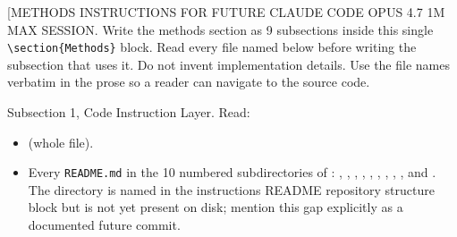 %
%

\begin{sectionaccent}

[METHODS INSTRUCTIONS FOR FUTURE CLAUDE CODE OPUS 4.7 1M MAX SESSION.
Write the methods section as 9 subsections inside this single
\texttt{\textbackslash section\{Methods\}} block. Read every file named
below before writing the subsection that uses it. Do not invent
implementation details. Use the file names verbatim in the prose so a
reader can navigate to the source code.

Subsection 1, Code Instruction Layer. Read:
\begin{itemize}
  \item {}
        (whole file).
  \item Every \texttt{README.md} in the 10 numbered subdirectories of
        :
        , ,
        ,
        ,
        ,
        ,
        ,
        ,
        , and
        . The
         directory is
        named in the instructions README repository structure block
        but is not yet present on disk; mention this gap explicitly
        as a documented future commit.
\end{itemize}


\end{sectionaccent}
